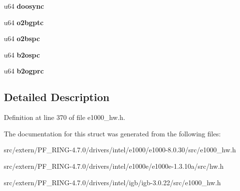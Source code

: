 \begin{DoxyCompactItemize}
\item 
\hypertarget{structe1000__hw__stats_a6aa4b58c845e7faeadd84d9c30cf96af}{
u64 {\bfseries doosync}}
\label{structe1000__hw__stats_a6aa4b58c845e7faeadd84d9c30cf96af}

\item 
\hypertarget{structe1000__hw__stats_ad33f2712aabac8146e0f5c86435e9c76}{
u64 {\bfseries o2bgptc}}
\label{structe1000__hw__stats_ad33f2712aabac8146e0f5c86435e9c76}

\item 
\hypertarget{structe1000__hw__stats_acfb24db7929cc5ae72c7be9e261c8cf1}{
u64 {\bfseries o2bspc}}
\label{structe1000__hw__stats_acfb24db7929cc5ae72c7be9e261c8cf1}

\item 
\hypertarget{structe1000__hw__stats_ad475dfe51abe7b0ee23b34f5ab13d1ad}{
u64 {\bfseries b2ospc}}
\label{structe1000__hw__stats_ad475dfe51abe7b0ee23b34f5ab13d1ad}

\item 
\hypertarget{structe1000__hw__stats_a9beda9f352005b148d41f2b4aa12d507}{
u64 {\bfseries b2ogprc}}
\label{structe1000__hw__stats_a9beda9f352005b148d41f2b4aa12d507}

\end{DoxyCompactItemize}


\subsection{Detailed Description}


Definition at line 370 of file e1000\_\-hw.h.



The documentation for this struct was generated from the following files:\begin{DoxyCompactItemize}
\item 
src/extern/PF\_\-RING-\/4.7.0/drivers/intel/e1000/e1000-\/8.0.30/src/e1000\_\-hw.h\item 
src/extern/PF\_\-RING-\/4.7.0/drivers/intel/e1000e/e1000e-\/1.3.10a/src/hw.h\item 
src/extern/PF\_\-RING-\/4.7.0/drivers/intel/igb/igb-\/3.0.22/src/e1000\_\-hw.h\end{DoxyCompactItemize}
